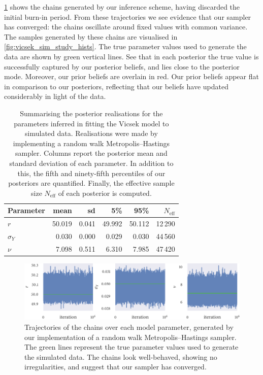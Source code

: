 \cref{fig:vicsek_sim_study_chains} shows the chains generated by our inference scheme,
having discarded the initial burn-in period. From these trajectories we see evidence that
our sampler has converged: the chains oscillate around fixed values with common
variance.  The samples generated by these chains are visualised in
\cref{fig:vicsek_sim_study_hists}.  The true parameter values used to generate the data
are shown by green vertical lines. See that in each posterior the true value is
successfully captured by our posterior beliefs, and lies close to the posterior mode.
Moreover, our prior beliefs are overlain in red. Our prior beliefs appear flat in
comparison to our posteriors, reflecting that our beliefs have updated considerably in
light of the data.
\begin{table}[tb]
\begin{tabular}{@{}lrrrrr@{}}
\toprule
Parameter &   mean &    sd &    5\% &   95\% & $N_{\textrm{eff}}$ \\
\midrule
$r$          & 50.019 & 0.041 & 49.992 & 50.112 &            12\,290 \\
$\sigma_{Y}$ &  0.030 & 0.000 &  0.029 &  0.030 &            44\,560 \\
$\nu$        &  7.098 & 0.511 &  6.310 &  7.985 &            47\,420 \\
\bottomrule
\end{tabular}
\caption{Summarising the posterior realisations for the parameters inferred in fitting the
    Vicsek model to simulated data. Realisations were made by implementing a random walk
    Metropolis--Hastings sampler. Columns report the posterior mean and standard deviation
    of each parameter. In addition to this, the fifth and ninety-fifth percentiles of our
    posteriors are quantified. Finally, the effective sample size $N_{\textrm{eff}}$ of
    each posterior is computed.}
    \label{tab:vicsek_sim_study_summary}
\end{table}
\begin{figure}[tb]
    \includegraphics{mh_r_trace.pdf}
    \caption{Trajectories of the chains over each model parameter, generated by our
    implementation of a random walk Metropolis--Hastings sampler. The green lines
    represent the true parameter values used to generate the simulated data. The chains
    look well-behaved, showing no irregularities, and suggest that our sampler has
    converged.}
    \label{fig:vicsek_sim_study_chains}
\end{figure}

